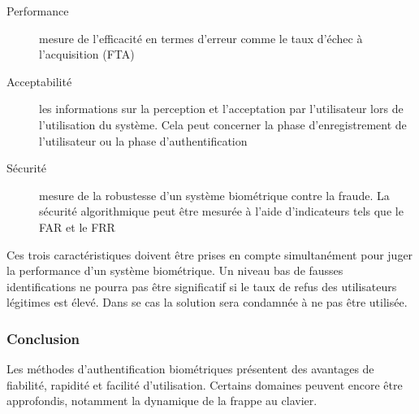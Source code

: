 \begin{description}
\item[Performance] mesure de l'efficacité en termes d'erreur comme le taux d'échec à l'acquisition (FTA)
\item[Acceptabilité] les informations sur la perception et l'acceptation par l'utilisateur lors de l'utilisation du système. Cela peut concerner la phase d'enregistrement de l'utilisateur\cite{giotSVM} ou la phase d'authentification 
\item[Sécurité] mesure de la robustesse d'un système biométrique contre la fraude. La sécurité algorithmique peut être mesurée à l'aide d'indicateurs tels que le FAR et le FRR
\end{description}

Ces trois caractéristiques doivent être prises en compte simultanément pour juger la performance d'un système biométrique. Un niveau bas de fausses identifications ne pourra pas être significatif si le taux de refus des utilisateurs légitimes est élevé. Dans se cas la solution sera condamnée à ne pas être utilisée.

\subsubsection{Conclusion}

Les méthodes d'authentification biométriques présentent des avantages de fiabilité, rapidité et facilité d'utilisation. Certains domaines peuvent encore être approfondis, notamment la dynamique de la frappe au clavier.
